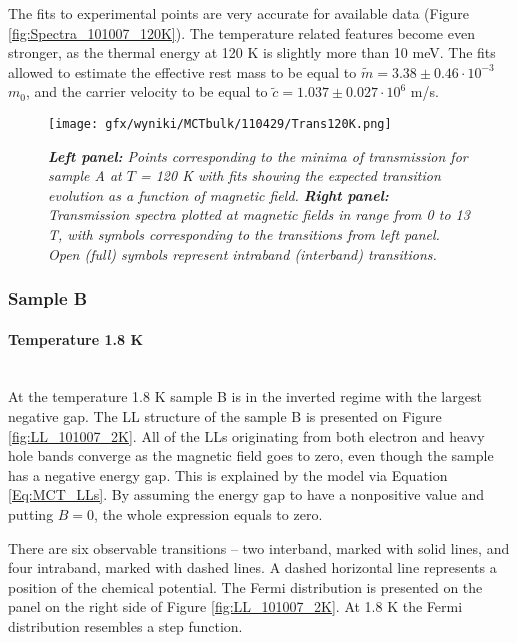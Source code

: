 \documentclass[titlepage,a4paper]{book}
\newcommand{\wciecie}{\quad\phantom{v}}
\newcommand{\myparagraph}[1]{\paragraph{#1}\mbox{}\\}
\begin{document}
The fits to experimental points are very accurate for available data (Figure \ref{fig:Spectra_101007_120K}). The temperature related features become even stronger, as the thermal energy at 120 K is slightly more than 10 meV. The fits allowed to estimate the effective rest mass to be equal to $\tilde m = 3.38 \pm 0.46 \cdot 10^{-3}$ $m_0$, and the carrier velocity to be equal to $\tilde{c} = 1.037 \pm 0.027 \cdot 10^6$ m/s. 

\begin{figure}[ht]
	\centering
	\texttt{[image: gfx/wyniki/MCTbulk/110429/Trans120K.png]}
	\vspace{-10pt}
	\caption{\textit{\textbf{Left panel:} Points corresponding to the minima of transmission for sample A at $T$ = 120 K with fits showing the expected transition evolution as a function of magnetic field. \textbf{Right panel:} Transmission spectra plotted at magnetic fields in range from 0 to 13 T, with symbols corresponding to the transitions from left panel. Open (full) symbols represent intraband (interband) transitions.}}
	\label{fig:Spectra_110429_120K}
\end{figure}

\clearpage
\subsubsection{Sample B}
\myparagraph{Temperature 1.8 K}
\wciecie
At the temperature 1.8 K sample B is in the inverted regime with the largest negative gap. The LL structure of the sample B is presented on Figure \ref{fig:LL_101007_2K}. All of the LLs originating from both electron and heavy hole bands converge as the magnetic field goes to zero, even though the sample has a negative energy gap. This is explained by the model via Equation \ref{Eq:MCT_LLs}. By assuming the energy gap to have a nonpositive value and putting $B = 0$, the whole expression equals to zero.

There are six observable transitions -- two interband, marked with solid lines, and four intraband, marked with dashed lines. A dashed horizontal line represents a position of the chemical potential. The Fermi distribution is presented on the panel on the right side of Figure \ref{fig:LL_101007_2K}. At 1.8 K the Fermi distribution resembles a step function.
\end{document}
